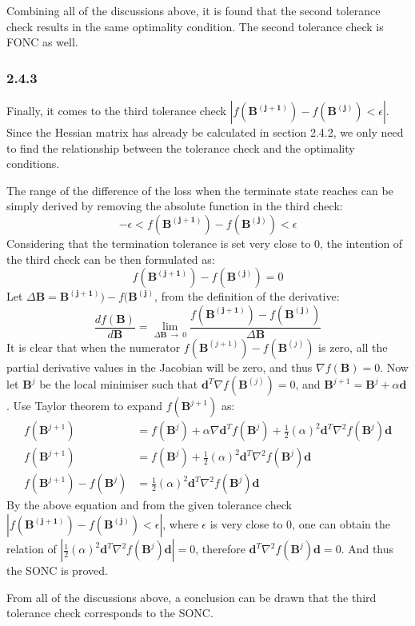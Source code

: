 \documentclass[12pt]{article}
\numberwithin{equation}{section}
\theoremstyle{remark}
\newcommand{\vect}[1]{\boldsymbol{#1}}
\begin{document}
\medskip
Combining all of the discussions above, it is found that the second tolerance check results in the same optimality condition. The second tolerance check is FONC as well.

\subsubsection{2.4.3}
Finally, it comes to the third tolerance check $|f(\vect{B^{(j+1)}}) - f(\vect{B^{(j)}}) < \epsilon|$. Since the Hessian matrix has already be calculated in section 2.4.2, we only need to find the relationship between the tolerance check and the optimality conditions.

\medskip
The range of the difference of the loss when the terminate state reaches can be simply derived by removing the absolute function in the third check:
\begin{equation}
-\epsilon < f(\vect{B^{(j+1)}}) - f(\vect{B^{(j)}}) < \epsilon
\end{equation}
Considering that the termination tolerance is set very close to 0, the intention of the third check can be then formulated as:
\begin{equation}
f(\vect{B^{(j+1)}}) - f(\vect{B^{(j)}}) = 0
\end{equation}
Let $\Delta\vect{B} = \vect{B^{(j+1)}}) - f(\vect{B^{(j)}}$, from the definition of the derivative:
\begin{equation}
\frac{df(\vect{B})}{d\vect{B}} = \mathop{lim}\limits_{\Delta\vect{B}\  \rightarrow\ 0} \frac{f(\vect{B^{(j+1)}}) - f(\vect{B^{(j)}})}{\Delta\vect{B}}
\end{equation}
It is clear that when the numerator $f(\vect{B}^{(j+1)}) - f(\vect{B}^{(j)})$ is zero, all the partial derivative values in the Jacobian will be zero, and thus $\nabla f(\vect{B}) = 0$. Now let $\vect{B}^{j}$ be the local minimiser such that $ \vect{d}^{T}\nabla f(\vect{B}^{(j)}) = 0$, and $\vect{B}^{j+1} = \vect{B}^{j} + \alpha \vect{d}$. Use Taylor theorem to expand $f(\vect{B}^{j+1})$ as:
\begin{align}
f(\vect{B}^{j+1}) &= f(\vect{B}^{j}) + \alpha \nabla \vect{d}^{T}f(\vect{B}^{j}) + \frac{1}{2} (\alpha)^{2} \vect{d}^{T} \nabla^{2} f(\vect{B}^{j}) \vect{d} \\
f(\vect{B}^{j+1}) &= f(\vect{B}^{j}) + \frac{1}{2} (\alpha)^{2} \vect{d}^{T} \nabla^{2} f(\vect{B}^{j}) \vect{d} \\
f(\vect{B}^{j+1}) - f(\vect{B}^{j}) &= \frac{1}{2} (\alpha)^{2} \vect{d}^{T} \nabla^{2} f(\vect{B}^{j}) \vect{d}
\end{align}
By the above equation and from the given tolerance check $|f(\vect{B^{(j+1)}}) - f(\vect{B^{(j)}}) < \epsilon|$, where $\epsilon$ is very close to 0, one can obtain the relation of $|\frac{1}{2} (\alpha)^{2} \vect{d}^{T} \nabla^{2} f(\vect{B}^{j}) \vect{d}| = 0$, therefore $\vect{d}^{T} \nabla^{2} f(\vect{B}^{j}) \vect{d} = 0$. And thus the SONC is proved.

\medskip
From all of the discussions above, a conclusion can be drawn that the third tolerance check corresponds to the SONC.  
\end{document}
